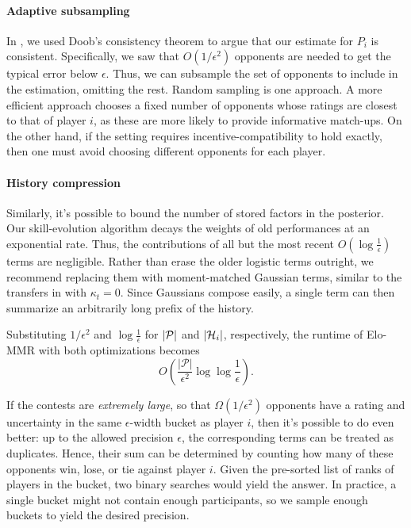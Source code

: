 \paragraph{Adaptive subsampling}
In , we used Doob's consistency theorem to argue that our estimate for $P_i$ is consistent. Specifically, we saw that $O(1/\epsilon^2)$ opponents are needed to get the typical error below $\epsilon$. Thus, we can subsample the set of opponents to include in the estimation, omitting the rest. Random sampling is one approach. A more efficient approach chooses a fixed number of opponents whose ratings are closest to that of player $i$, as these are more likely to provide informative match-ups. On the other hand, if the setting requires incentive-compatibility to hold exactly, then one must avoid choosing different opponents for each player.

\paragraph{History compression}
Similarly, it's possible to bound the number of stored factors in the posterior. Our skill-evolution algorithm decays the weights of old performances at an exponential rate. Thus, the contributions of all but the most recent $O(\log\frac 1\epsilon)$ terms are negligible. Rather than erase the older logistic terms outright, we recommend replacing them with moment-matched Gaussian terms, similar to the transfers in  with $\kappa_t=0$. Since Gaussians compose easily, a single term can then summarize an arbitrarily long prefix of the history.

Substituting $1/\epsilon^2$ and $\log\frac 1\epsilon$ for $|\mathcal{P}|$ and $|{\mathcal{H}}_i|$, respectively, the runtime of Elo-MMR with both optimizations becomes
\[O\left(\frac {|\mathcal P|}{\epsilon^2} \log\log\frac 1\epsilon\right).\]

If the contests are \emph{extremely large}, so that $\Omega(1/\epsilon^2)$ opponents have a rating and uncertainty in the same $\epsilon$-width bucket as player $i$, then it's possible to do even better: up to the allowed precision $\epsilon$, the corresponding terms can be treated as duplicates. Hence, their sum can be determined by counting how many of these opponents win, lose, or tie against player $i$. Given the pre-sorted list of ranks of players in the bucket, two binary searches would yield the answer. In practice, a single bucket might not contain enough participants, so we sample enough buckets to yield the desired precision.


